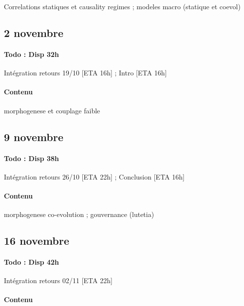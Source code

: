 Correlations statiques et causality regimes ; modeles macro (statique et coevol)


\subsection*{2 novembre}


\paragraph{Todo : Disp 32h}

Intégration retours 19/10 [ETA 16h] ; Intro [ETA 16h] 


\paragraph{Contenu}

morphogenese et couplage faible


\subsection*{9 novembre}


\paragraph{Todo : Disp 38h}

Intégration retours 26/10 [ETA 22h] ; Conclusion [ETA 16h] 



\paragraph{Contenu}

morphogenese co-evolution ; gouvernance (lutetia)




\subsection*{16 novembre}

\paragraph{Todo : Disp 42h}

Intégration retours 02/11 [ETA 22h]


\paragraph{Contenu}

